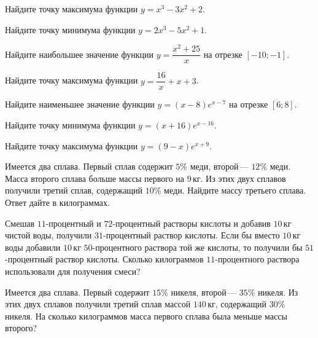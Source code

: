 \begin{class}[number=2]
	\begin{listofex}
		\item Найдите точку максимума функции \(y=x^3-3x^2+2\).
		\item Найдите точку минимума функции \(y=2x^3-5x^2+1\).
		\item Найдите наибольшее значение функции \(y=\dfrac{ x^2+25 }{ x }\) на отрезке \([-10;-1]\).
		\item Найдите точку максимума функции \(y=\dfrac{ 16 }{x  }+x+3\).
		\item Найдите наименьшее значение функции \(y=(x-8)e^{x-7}\) на отрезке \([6;8]\).
		\item Найдите точку минимума функции \(y=(x+16)e^{x-16}\).
		\item Найдите точку максимума функции \(y=(9-x)e^{x+9}\).
		\item Имеется два сплава. Первый сплав содержит \(5\%\) меди, второй --- \(12\%\) меди. Масса второго сплава больше массы первого на \(9\) кг. Из этих двух сплавов получили третий сплав, содержащий \(10\%\) меди. Найдите массу третьего сплава. Ответ дайте в килограммах.
		
		\item Смешав \(11\)-процентный и \(72\)-процентный растворы кислоты и добавив \(10\) кг чистой воды, получили \(31\)-процентный раствор кислоты. Если бы вместо \(10\) кг воды добавили \(10\) кг \(50\)-процентного раствора той же кислоты, то получили бы \(51\)-процентный раствор кислоты. Сколько килограммов \(11\)-процентного раствора использовали для получения смеси?
		
		\item Имеется два сплава. Первый содержит \(15\%\) никеля, второй --- \(35\%\) никеля. Из этих двух сплавов получили третий сплав массой \(140\) кг, содержащий \(30\%\) никеля. На сколько килограммов масса первого сплава была меньше массы второго?
		

\end{listofex}
\end{class}
